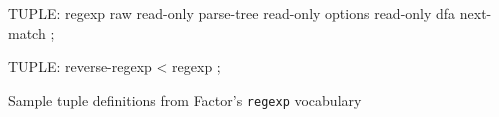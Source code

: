\centering

  \begin{factorcode}
    TUPLE: regexp
        { raw read-only }
        { parse-tree read-only }
        { options read-only }
        dfa next-match ;

    TUPLE: reverse-regexp < regexp ;
  \end{factorcode}

\caption{Sample tuple definitions from Factor's \texttt{regexp} vocabulary}
